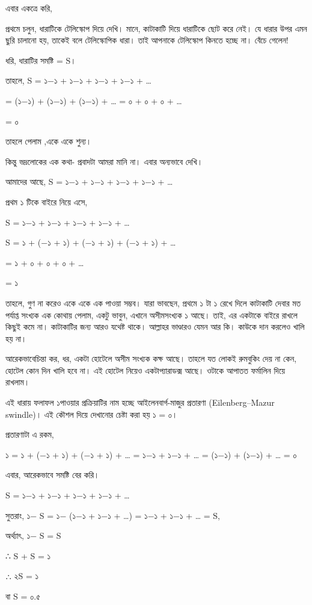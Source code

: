 \documentclass[
]{book}
\begin{document}
এবার একত্রে করি,

প্রথমে চলুন, ধারাটিকে টেলিস্কোপ দিয়ে দেখি। মানে, কাটাকাটি দিয়ে ধারাটিকে ছোট করে নেই। যে ধারার উপর এমন ছুরি চালানো হয়, তাকেই বলে টেলিস্কোপিক ধারা। তাই আপনাকে টেলিস্কোপ কিনতে হচ্ছে না। বেঁচে গেলেন!

ধরি, ধারাটির সমষ্টি = S।

তাহলে, S = ১−১ + ১−১ + ১−১ + ১−১ + \ldots{}

= (১−১) + (১−১) + (১−১) + \ldots{} = ০ + ০ + ০ + \ldots{}

= ০

তাহলে পেলাম ,একে একে শুন্য।

কিন্তু ভদ্রলোকের এক কথা- প্রবাদটা আমরা মানি না। এবার অন্যভাবে দেখি।

আমাদের আছে, S = ১−১ + ১−১ + ১−১ + ১−১ + \ldots{}

প্রথম ১ টিকে বাইরে নিয়ে এসে,

S = ১−১ + ১−১ + ১−১ + ১−১ + \ldots{}

S = ১ + (−১ + ১) + (−১ + ১) + (−১ + ১) + \ldots{}

= ১ + ০ + ০ + ০ + \ldots{}

= ১

তাহলে, গুণ না করেও একে একে এক পাওয়া সম্ভব। যারা ভাবছেন, প্রথমে ১ টা ১ রেখে দিলে কাটাকাটি দেবার মত পর্যাপ্ত সংখ্যক এক কোথায় পেলাম, একটু ভাবুন, এখানে অসীমসংখ্যক ১ আছে। তাই, এর একটাকে বাইরে রাখলে কিছুই কমে না। কাটাকাটির জন্য আরও যথেষ্ট থাকে। আল্লাহর ভাণ্ডারও যেমন আর কি। কাউকে দান করলেও খালি হয় না।

আরেকভাবেচিন্তা কর, ধর, একটা হোটেলে অসীম সংখ্যক কক্ষ আছে। তাহলে যত লোকই রুমবুকিং দেয় না কেন, হোটেল কোন দিন খালি হবে না। এই হোটেল নিয়েও একটাপ্যারাডক্স আছে। ওটাকে আপাতত ফর্মালিন দিয়ে রাখলাম।

এই ধারায় ফলাফল ১পাওয়ার প্রক্রিয়াটির নাম হচ্ছে আইলেনবার্গ-মাজুর প্রতারণা (Eilenberg--Mazur swindle)। এই কৌশল দিয়ে দেখানোর চেষ্টা করা হয় ১ = ০।

প্রতারণাটা এ রকম,

১ = ১ + (−১ + ১) + (−১ + ১) + \ldots{} = ১−১ + ১−১ + \ldots{} = (১−১) + (১−১) + \ldots{} = ০

এবার, আরেকভাবে সমষ্টি বের করি।

S = ১−১ + ১−১ + ১−১ + ১−১ + \ldots{}

সুতরাং, ১− S = ১− (১−১ + ১−১ + \ldots) = ১−১ + ১−১ + \ldots{} = S,

অর্থ্যাৎ, ১− S = S

∴ S + S = ১

∴ ২S = ১

বা S = ০.৫
\end{document}

